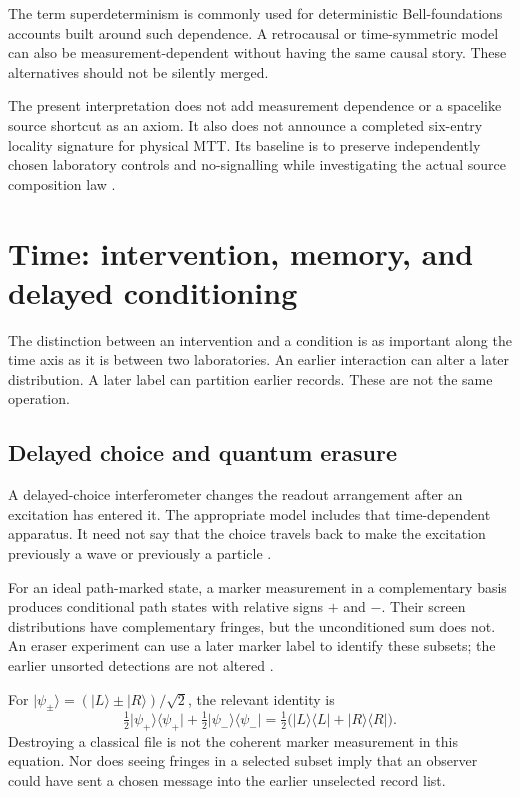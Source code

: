 \documentclass[11pt,a4paper]{article}
\newcommand{\ket}[1]{\lvert #1\rangle}
\newcommand{\bra}[1]{\langle #1\rvert}
\begin{document}
The term superdeterminism is commonly used for deterministic Bell-foundations accounts built around such dependence. A retrocausal or time-symmetric model can also be measurement-dependent without having the same causal story. These alternatives should not be silently merged.

The present interpretation does not add measurement dependence or a spacelike source shortcut as an axiom. It also does not announce a completed six-entry locality signature for physical MTT. Its baseline is to preserve independently chosen laboratory controls and no-signalling while investigating the actual source composition law \cite{NeroBell}.

\section{Time: intervention, memory, and delayed conditioning}
\label{sec:time}
The distinction between an intervention and a condition is as important along the time axis as it is between two laboratories. An earlier interaction can alter a later distribution. A later label can partition earlier records. These are not the same operation.

\subsection{Delayed choice and quantum erasure}
A delayed-choice interferometer changes the readout arrangement after an excitation has entered it. The appropriate model includes that time-dependent apparatus. It need not say that the choice travels back to make the excitation previously a wave or previously a particle \cite{Jacques}.

For an ideal path-marked state, a marker measurement in a complementary basis produces conditional path states with relative signs \(+\) and \(-\). Their screen distributions have complementary fringes, but the unconditioned sum does not. An eraser experiment can use a later marker label to identify these subsets; the earlier unsorted detections are not altered \cite{Kim}.

For \(\ket{\psi_\pm}=(\ket L\pm\ket R)/\sqrt2\), the relevant identity is
\begin{equation}
\tfrac12\ket{\psi_+}\bra{\psi_+}+
\tfrac12\ket{\psi_-}\bra{\psi_-}
=\tfrac12\bigl(\ket L\bra L+\ket R\bra R\bigr).
\end{equation}
Destroying a classical file is not the coherent marker measurement in this equation. Nor does seeing fringes in a selected subset imply that an observer could have sent a chosen message into the earlier unselected record list.
\end{document}
